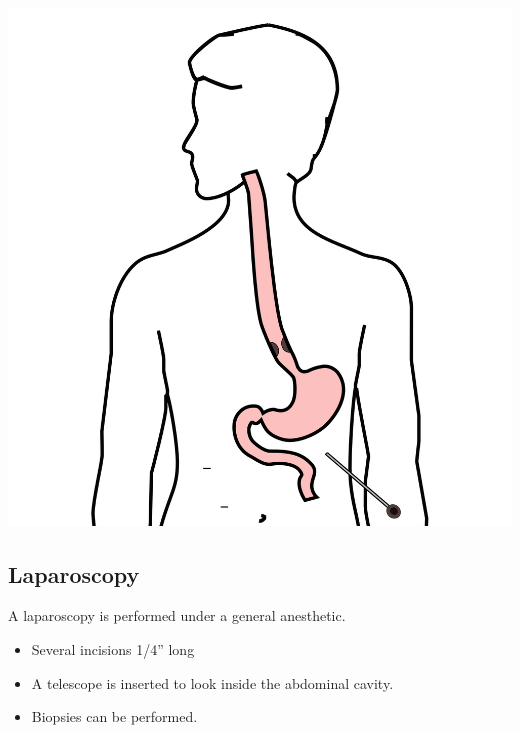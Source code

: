 \documentclass[
  letterpaper,
  DIV=11,
  numbers=noendperiod]{scrartcl}
\providecommand{\tightlist}{%
  \setlength{\itemsep}{0pt}\setlength{\parskip}{0pt}}\usepackage{longtable,booktabs,array}
\begin{document}
\includegraphics{christmas2004_files/mediabag/Eso_Laparoscopy.png}

\subsection{Laparoscopy}\label{laparoscopy-1}

A laparoscopy is performed under a general anesthetic.

\begin{itemize}
\tightlist
\item
  Several incisions 1/4'' long
\item
  A telescope is inserted to look inside the abdominal cavity.
\item
  Biopsies can be performed.
\end{itemize}
\end{document}
